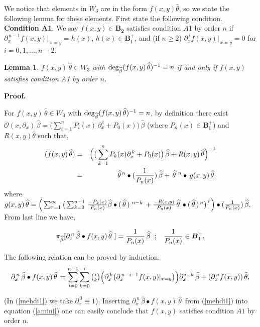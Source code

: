 \documentclass[10pt]{article}
\newcommand{\be}{\begin{equation}}
\newcommand{\ee}{\end{equation}}
\newcommand{\bea}{\begin{eqnarray}}
\newcommand{\eea}{\end{eqnarray}}
\newcommand{\nn}{\nonumber}
\newcommand{\rd}{\partial}
\newcommand{\PP}{\boldsymbol{B}^{+}_1}
\newcommand{\Deg}{\rm deg_{\widehat{\beta}}}
\newtheorem{lem}{Lemma}
\begin{document}
{{We notice that elements in $W_3$ are in the form
$f(x,y)\widehat\theta$,
so we state the following lemma for these elements. First state the following condition.\\

{\bf Condition A1}, {We say $f(x,y)\in {\boldsymbol{B_2}}$ satisfies
condition $A1$ by order $n$ if
$\rd^{\,n-1}_{x}f(x,y)|_{\,x=y}=h(x)$, $h(x)\in\PP$, and (if $n\geq
2$) $\rd^{\,i}_{x}f(x,y)|_{\,x=y}=0$ for $i=0,1,...,n-2$.\\}

\begin{lem}\label{ghasem}{$f(x,y)\,\widehat\theta \in W_3$ with ${\Deg}
(f(x,y)\,\widehat\theta)^{-1}=n$ if and only if $f(x,y)$ satisfies
condition A1 by order $n$.\\}
\end{lem}
{\bf Proof.} {For $f(x,y)\,\widehat\theta\in W_3$ with ${\Deg}
(f(x,y)\,\widehat\theta)^{-1}=n$, by definition there exist
${\mathcal{O}}(x,\rd_{x})\,\widehat{\beta}=\big(\sum^{n}_{i=1}
P_{i}(x) \,\rd_{x}^{\,i}+P_{0}(x)\big)\,\widehat{\beta}$ (where
$P_{n}(x)\in \PP$) and $R(x,y)\widehat\theta$ such that, \bea
(f(x,y)\,\widehat\theta)&=&\Big(\big(\sum^{n}_{k=1} P_{k}(x)
\rd_{x}^{\,k}+P_{0}(x)\big)\,\widehat{\beta}+
 R(x,y)\,\widehat{\theta}\Big)^{-1}\nn\\&=&\widehat{\theta}^{\,
n}\bullet({1\over
P_{n}(x)})\,\widehat{\beta}+\,\widehat{\theta}\,^{\,
n}\bullet\,g(x,y)\,\widehat{\theta}.\label{khoda11}\nn\eea where $
g(x,y)\,\widehat{\theta}=\Big(\sum_{r=1}^{\infty}\big(\sum_{k=0}^{n-1}
\,{-P_{k}(x)\over
P_{n}(x)}\widehat{\beta}\bullet(\,\widehat{\theta}\,)^{\,\,
{n-k}}\,+{-R(x,y)\over
P_{n}(x)}\,\widehat{\theta}\,\bullet(\,\widehat{\theta}\,)^{\,n}
\big)^{\,r}\Big)\bullet ({1\over P_{n}(x)})\,\widehat{\beta}.$ From
last line we have,

\be  {\pi}_{\widehat\beta} [\rd_{x}^{\,n}{\,\widehat\beta} \bullet
f(x,y)\,\widehat\theta\,\,]={1\over
P_{n}(x)}{\,\widehat\beta}\hspace{0.2cm};\hspace{0.3cm}  {1\over
P_{n}(x)}\in \PP.\label{amini}\ee

The following relation can be proved by induction. \be
\rd^{\,n}_{x}{\,\widehat\beta}\bullet f(x,y)\,\widehat\theta\, =
\sum^{n-1}_{i=0} \sum^{i}_{k=0} {\tbinom ik} \Big(\rd^{\,k}_{x} \big
(\rd^{\,n-i-1}_{x}
f(x,y)|_{x=y}\big)\Big)\rd^{\,i-k}_{x}{\,\widehat\beta} +
(\rd^{\,n}_{x} f(x,y))\,\widehat\theta,\label{mehdi1}\ee

(In (\ref{mehdi1}) we take $\rd^{\,0}_{x}\equiv 1$). Inserting
$\rd^{\,n}_{x}{\,\widehat\beta}\bullet f(x,y)\,\widehat\theta\,$
from (\ref{mehdi1}) into equation (\ref{amini}) one can easily
conclude that $f(x,y)$ satisfies condition $A1$ by order $n$.\\

}}}
\end{document}
